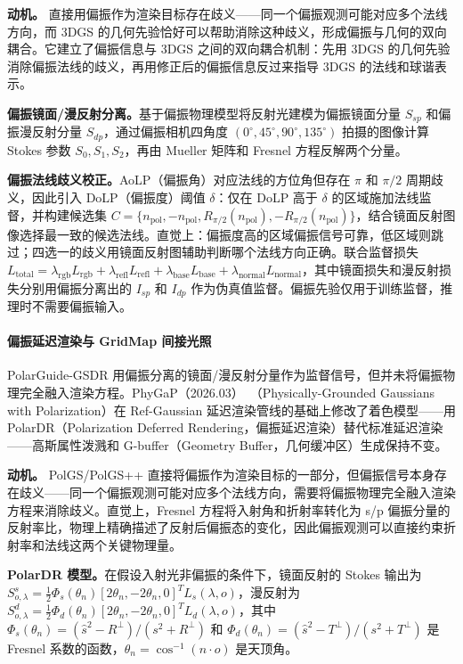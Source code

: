 \textbf{动机。} 直接用偏振作为渲染目标存在歧义——同一个偏振观测可能对应多个法线方向，而 3DGS 的几何先验恰好可以帮助消除这种歧义，形成偏振与几何的双向耦合。它建立了偏振信息与 3DGS 之间的双向耦合机制：先用 3DGS 的几何先验消除偏振法线的歧义，再用修正后的偏振信息反过来指导 3DGS 的法线和球谐表示。

\textbf{偏振镜面/漫反射分离。}基于偏振物理模型将反射光建模为偏振镜面分量 $S_{sp}$ 和偏振漫反射分量 $S_{dp}$，通过偏振相机四角度 $(0^\circ, 45^\circ, 90^\circ, 135^\circ)$ 拍摄的图像计算 Stokes 参数 $S_0, S_1, S_2$，再由 Mueller 矩阵和 Fresnel 方程反解两个分量。

\textbf{偏振法线歧义校正。}AoLP（偏振角）对应法线的方位角但存在 $\pi$ 和 $\pi/2$ 周期歧义，因此引入 DoLP（偏振度）阈值 $\delta$：仅在 DoLP 高于 $\delta$ 的区域施加法线监督，并构建候选集 $C = \{n_\text{pol}, -n_\text{pol}, R_{\pi/2}(n_\text{pol}), -R_{\pi/2}(n_\text{pol})\}$，结合镜面反射图像选择最一致的候选法线。直觉上：偏振度高的区域偏振信号可靠，低区域则跳过；四选一的歧义用镜面反射图辅助判断哪个法线方向正确。联合监督损失 $L_\text{total} = \lambda_\text{rgb} L_\text{rgb} + \lambda_\text{refl} L_\text{refl} + \lambda_\text{base} L_\text{base} + \lambda_\text{normal} L_\text{normal}$，其中镜面损失和漫反射损失分别用偏振分离出的 $I_{sp}$ 和 $I_{dp}$ 作为伪真值监督。偏振先验仅用于训练监督，推理时不需要偏振输入。

\paragraph{偏振延迟渲染与 GridMap 间接光照}

PolarGuide-GSDR 用偏振分离的镜面/漫反射分量作为监督信号，但并未将偏振物理完全融入渲染方程。PhyGaP（2026.03）~\cite{2603_14001}（Physically-Grounded Gaussians with Polarization）在 Ref-Gaussian 延迟渲染管线的基础上修改了着色模型——用 PolarDR（Polarization Deferred Rendering，偏振延迟渲染）替代标准延迟渲染——高斯属性泼溅和 G-buffer（Geometry Buffer，几何缓冲区）生成保持不变。

\textbf{动机。} PolGS/PolGS++ 直接将偏振作为渲染目标的一部分，但偏振信号本身存在歧义——同一个偏振观测可能对应多个法线方向，需要将偏振物理完全融入渲染方程来消除歧义。直觉上，Fresnel 方程将入射角和折射率转化为 s/p 偏振分量的反射率比，物理上精确描述了反射后偏振态的变化，因此偏振观测可以直接约束折射率和法线这两个关键物理量。

\textbf{PolarDR 模型。}在假设入射光非偏振的条件下，镜面反射的 Stokes 输出为 $S_{o,\lambda}^s = \frac{1}{2} \Phi_s(\theta_n)[2\theta_n, -2\theta_n, 0]^T L_s(\lambda, o)$，漫反射为 $S_{o,\lambda}^d = \frac{1}{2} \Phi_d(\theta_n)[2\theta_n, -2\theta_n, 0]^T L_d(\lambda, o)$，其中 $\Phi_s(\theta_n) = (\hat{s}^2 - R^\perp)/(s^2 + R^\perp)$ 和 $\Phi_d(\theta_n) = (\hat{s}^2 - T^\perp)/(s^2 + T^\perp)$ 是 Fresnel 系数的函数，$\theta_n = \cos^{-1}(n \cdot o)$ 是天顶角。

